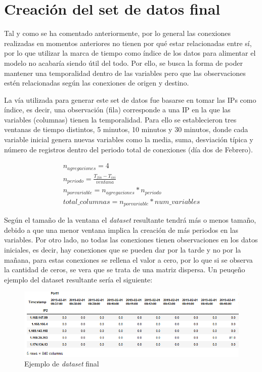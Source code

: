 \section{Creación del set de datos final}

Tal y como se ha comentado anteriormente, por lo general las conexiones realizadas en momentos anteriores no tienen por qué estar relacionadas entre sí, por lo que utilizar la marca de tiempo como índice de los datos para alimentar el modelo no acabaría siendo útil del todo. Por ello, se busca la forma de poder mantener una temporalidad dentro de las variables pero que las observaciones estén relacionadas según las conexiones de origen y destino.

La vía utilizada para generar este set de datos fue basarse en tomar las IPs como índice, es decir, una observación (fila) corresponde a una IP en la que las variables (columnas) tienen la temporalidad. Para ello se establecieron tres ventanas de tiempo distintos, 5 minutos, 10 minutos y 30 minutos, donde cada variable inicial genera nuevas variables como la media, suma, desviación típica y número de registros dentro del periodo total de conexiones (día dos de Febrero).

\begin{gather*}
n_{agregaciones} = 4 \\
n_{periodo} = \frac{T_{fin} - T_{ini}}{ventana} \\
n_{por variable} = n_{agregaciones} * n_{periodo} \\
total\_columnas = n_{por variable} * num\_variables
\end{gather*}

Según el tamaño de la ventana el \textit{dataset} resultante tendrá más o menos tamaño, debido a que una menor ventana implica la creación de más periodos en las variables. Por otro lado, no todas las conexiones tienen observaciones en los datos iniciales, es decir, hay conexiones que se pueden dar por la tarde y no por la mañana, para estas conexiones se rellena el valor a cero, por lo que si se observa la cantidad de ceros, se vera que se trata de una matriz dispersa. Un peuqeño ejemplo del dataset resultante sería el siguiente:

\begin{figure}[H]
    \centering
    \includegraphics[width=15cm]{figs/dataset.PNG}
    \caption{Ejemplo de \textit{dataset} final}
    \label{fig:dataset}
\end{figure}